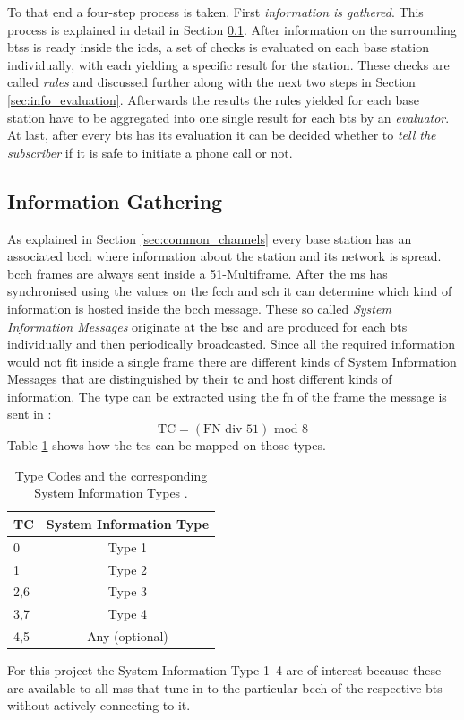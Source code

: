 To that end a four-step process is taken.
First \emph{information is gathered}.
This process is explained in detail in Section \ref{sec:info_gathering}.
After information on the surrounding \glspl{bts} is ready inside the \gls{icds}, a set of checks is evaluated on each base station individually, with each yielding a specific result for the station.
These checks are called \emph{rules} and discussed further along with the next two steps in Section \ref{sec:info_evaluation}.
Afterwards the results the rules yielded for each base station have to be aggregated into one single result for each \gls{bts} by an \emph{evaluator}.
At last, after every \gls{bts} has its evaluation it can be decided whether to \emph{tell the subscriber} if it is safe to initiate a phone call or not.

\subsection{Information Gathering}
\label{sec:info_gathering}
As explained in Section \ref{sec:common_channels} every base station has an associated \gls{bcch} where information about the station and its network is spread.
\gls{bcch} frames are always sent inside a 51-Multiframe.
After the \gls{ms} has synchronised using the values on the \gls{fcch} and \gls{sch} it can determine which kind of information is hosted inside the \gls{bcch} message.
These so called \emph{System Information Messages} originate at the \gls{bsc} and are produced for each \gls{bts} individually and then periodically broadcasted.
Since all the required information would not fit inside a single frame there are different kinds of System Information Messages that are distinguished by their \gls{tc} and host different kinds of information.
The type can be extracted using the \gls{fn} of the frame the message is sent in \cite{GSM2009}:
\[\text{TC}=(\text{FN} \text{ div } 51)\text{ mod } 8\]
Table \ref{tab:tc_mapping} shows how the \glspl{tc} can be mapped on those types.
\begin{table}
\centering
\begin{tabular}{lc}
\toprule
TC		&System Information Type\\
\midrule
0		&Type 1\\
1		&Type 2\\
2,6		&Type 3\\
3,7		&Type 4\\
4,5		&Any (optional)\\
\bottomrule
\end{tabular}
\caption{Type Codes and the corresponding System Information Types \cite{GSM2009}.}
\label{tab:tc_mapping}
\end{table}
For this project the System Information Type 1--4 are of interest because these are available to all \glspl{ms} that tune in to the particular \gls{bcch} of the respective \gls{bts} without actively connecting to it.

